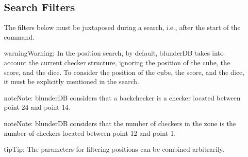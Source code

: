 \documentclass[letterpaper,10pt,english]{sphinxmanual}
\begin{document}
\subsection{Search Filters}
\label{\detokenize{cmd_mode:filtres-de-recherche}}\label{\detokenize{cmd_mode:cmd-filter}}
\sphinxAtStartPar
The filters below must be juxtaposed during a search, i.e., after the start of the  command.

\label{\detokenize{cmd_mode:cmd-filter-pos}}
\begin{sphinxadmonition}{warning}{Warning:}
\sphinxAtStartPar
In the position search, by default, blunderDB takes into account the current checker structure, ignoring the position of the cube, the score, and the dice. To consider the position of the cube, the score, and the dice, it must be explicitly mentioned in the search.
\end{sphinxadmonition}

\begin{sphinxadmonition}{note}{Note:}
\sphinxAtStartPar
blunderDB considers that a backchecker is a checker located between point 24 and point 14.
\end{sphinxadmonition}

\begin{sphinxadmonition}{note}{Note:}
\sphinxAtStartPar
blunderDB considers that the number of checkers in the zone is the number of checkers located between point 12 and point 1.
\end{sphinxadmonition}

\begin{sphinxadmonition}{tip}{Tip:}
\sphinxAtStartPar
The parameters for filtering positions can be combined arbitrarily.
\end{sphinxadmonition}
\end{document}
